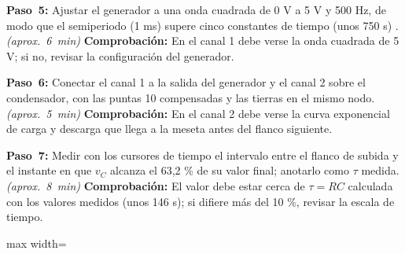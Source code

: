 \documentclass[12pt]{article}
\begin{document}
\begin{pasos}
  \item \textbf{Paso~5:} Ajustar el generador a una onda cuadrada de 0 V a 5 V y 500 Hz, de modo que el semiperiodo (1 ms) supere cinco constantes de tiempo (unos 750 \textmu{}s) \cite{ref1}. \emph{(aprox.~\SI{6}{\minute})} \textbf{Comprobación:} En el canal 1 debe verse la onda cuadrada de 5 V; si no, revisar la configuración del generador.
  \item \textbf{Paso~6:} Conectar el canal 1 a la salida del generador y el canal 2 sobre el condensador, con las puntas \texttimes{}10 compensadas y las tierras en el mismo nodo. \emph{(aprox.~\SI{5}{\minute})} \textbf{Comprobación:} En el canal 2 debe verse la curva exponencial de carga y descarga que llega a la meseta antes del flanco siguiente.
  \item \textbf{Paso~7:} Medir con los cursores de tiempo el intervalo entre el flanco de subida y el instante en que $v_C$ alcanza el 63,2 \% de su valor final; anotarlo como $\tau$ medida. \emph{(aprox.~\SI{8}{\minute})} \textbf{Comprobación:} El valor debe estar cerca de $\tau = RC$ calculada con los valores medidos (unos 146 \textmu{}s); si difiere más del 10 \%, revisar la escala de tiempo.
\par\medskip\noindent
\begin{minipage}{\linewidth}
  \centering
  \begin{adjustbox}{max width=\linewidth}
\end{adjustbox}
\end{minipage}
\end{pasos}
\end{document}
